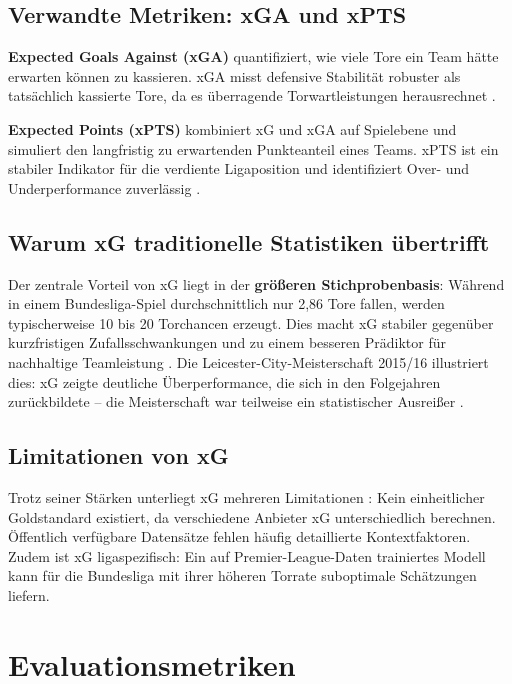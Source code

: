 \subsection{Verwandte Metriken: xGA und xPTS}

\textbf{Expected Goals Against (xGA)} quantifiziert, wie viele Tore ein
Team hätte erwarten können zu kassieren. xGA misst defensive Stabilität
robuster als tatsächlich kassierte Tore, da es überragende Torwartleistungen
herausrechnet \cite{VanEetveldeEtAl2024}.

\textbf{Expected Points (xPTS)} kombiniert xG und xGA auf Spielebene und
simuliert den langfristig zu erwartenden Punkteanteil eines Teams. xPTS
ist ein stabiler Indikator für die \glqq verdiente\grqq{} Ligaposition
und identifiziert Over- und Underperformance zuverlässig
\cite{Wheatcroft2022}.

\subsection{Warum xG traditionelle Statistiken übertrifft}

Der zentrale Vorteil von xG liegt in der \textbf{größeren Stichprobenbasis}:
Während in einem Bundesliga-Spiel durchschnittlich nur 2,86 Tore fallen,
werden typischerweise 10 bis 20 Torchancen erzeugt. Dies macht xG stabiler
gegenüber kurzfristigen Zufallsschwankungen und zu einem besseren Prädiktor
für nachhaltige Teamleistung \cite{AnzerBauer2021,WheatcroftVanEetvelde2020,LiuEtAl2023}.
Die Leicester-City-Meisterschaft 2015/16 illustriert dies: xG zeigte
deutliche Überperformance, die sich in den Folgejahren zurückbildete --
die Meisterschaft war teilweise ein statistischer Ausreißer
\cite{Wheatcroft2022}.

\subsection{Limitationen von xG}

Trotz seiner Stärken unterliegt xG mehreren Limitationen
\cite{Wheatcroft2022,BauerEpstein2023}: Kein einheitlicher Goldstandard
existiert, da verschiedene Anbieter xG unterschiedlich berechnen.
Öffentlich verfügbare Datensätze fehlen häufig detaillierte Kontextfaktoren.
Zudem ist xG ligaspezifisch: Ein auf Premier-League-Daten trainiertes
Modell kann für die Bundesliga mit ihrer höheren Torrate suboptimale
Schätzungen liefern.

\section{Evaluationsmetriken}
\label{sec:evaluationsmetriken}

